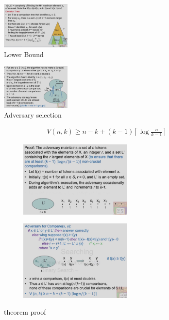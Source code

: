 \begin{figure}[H]
    \centering
    \includegraphics[width=0.309\textwidth]{pic/DAA3/Lower Bound}
    \caption{Lower Bound}
\end{figure}
 
\begin{figure}[H]
    \centering
    \includegraphics[width=0.309\textwidth]{pic/DAA3/Adversary selection}
    \caption{Adversary selection}
\end{figure}

\begin{theorem}
    \begin{align*}
        V(n,k)\ge n-k +(k-1)\left\lceil \log\frac{n}{k-1} \right\rceil
    \end{align*}
\end{theorem}

\begin{figure}[H]
    \centering
    \begin{subfigure}{0.48\textwidth}
        \centering
        \includegraphics[width=0.618\textwidth]{pic/DAA3/theoremproof1}
    \end{subfigure}
    \begin{subfigure}{0.48\textwidth}
        \centering
        \includegraphics[width=0.618\textwidth]{pic/DAA3/theoremproof2}
    \end{subfigure}
    \caption{theorem proof}
\end{figure}
